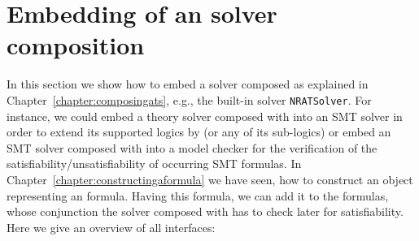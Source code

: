 \chapter{Embedding of an \smtrat solver composition}
\label{chapter:embedding}
In this section we show how to embed a solver composed as explained
in Chapter~\ref{chapter:composingats}, e.g., the built-in 
solver \texttt{NRATSolver}. For instance, we could embed a theory solver composed with \smtrat 
into an SMT solver in order to extend its supported logics by \SmtratLogic (or any of its sub-logics) 
or embed an SMT solver composed with \smtrat into a model checker for the verification of the 
satisfiability/unsatisfiability of occurring SMT formulas. In Chapter~\ref{chapter:constructingaformula}
we have seen, how to construct an object representing an \SmtratLogic formula. Having this formula,
we can add it to the formulas, whose conjunction the solver composed with \smtrat has to check later
for satisfiability. Here we give an overview of all interfaces:
